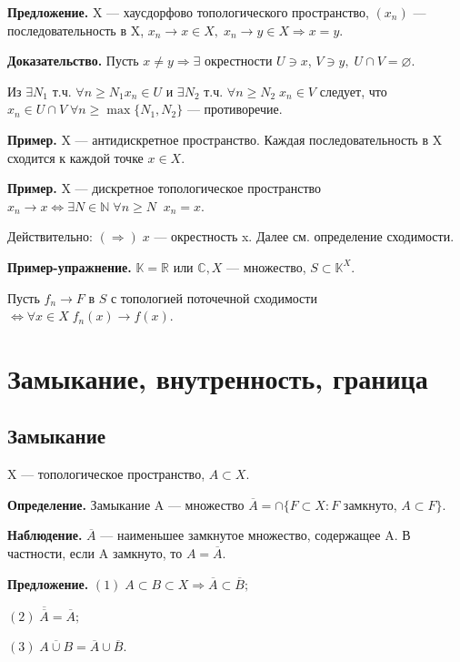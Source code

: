\documentclass[12pt,a4paper]{article}
\begin{document}
\textbf{Предложение.} X --- хаусдорфово топологического пространство, $(x_{n})$ --- последовательность в X, $x_{n} \to x \in X, \; x_{n} \to y \in X \Rightarrow x = y.$ 

\textbf{Доказательство.} Пусть $x \neq y \Rightarrow \exists$ окрестности $U \ni x$, $V \ni y, \; U \cap V = \varnothing.$

Из $\exists N_{1}$ т.ч. $\forall n \geq N_{1} x_{n} \in U$ и $\exists N_{2}$ т.ч. $\forall n \geq N_{2} \; x_{n} \in V$ следует, что $x_{n} \in U \cap V \; \forall n \geq \max\{{N_{1}, N_{2}}\}$ --- противоречие. 

\textbf{Пример.} X --- антидискретное пространство. Каждая последовательность в X сходится к каждой точке $x \in X.$ 

\textbf{Пример.} X --- дискретное топологическое пространство $x_{n} \to x \Leftrightarrow \exists N \in \mathbb{N} \; \forall n \geq N \; \; x_{n} = x.$ 

Действительно: $(\Rightarrow) \; {x}$ --- окрестность x. Далее см. определение сходимости. 

\textbf{Пример-упражнение.} $\mathbb{K} = \mathbb{R}$ или $\mathbb{C}, X$ --- множество, $S \subset \mathbb{K}^{X}.$

Пусть $f_{n} \to F$ в $S$ с топологией поточечной сходимости $\Leftrightarrow \forall x \in X \; f_{n}(x) \to f(x).$

\section{Замыкание, внутренность, граница} 

\subsection{Замыкание} 

X --- топологическое пространство, $A \subset X.$ 

\textbf{Определение.} Замыкание A --- множество $\overline{A} = \cap\{F \subset X: F$ замкнуто, $A \subset F\}.$ 

\textbf{Наблюдение.} $\overline{A}$ --- наименьшее замкнутое множество, содержащее A. В частности, если A замкнуто, то $A = \overline{A}.$ 

\textbf{Предложение.} $(1) \; A \subset B \subset X \Rightarrow \overline{A} \subset \overline{B};$

$(2) \; \overline{\overline{A}} = \overline{A};$ 

$(3) \; \overline{A \cup B} = \overline{A} \cup \overline{B}.$
\end{document}
